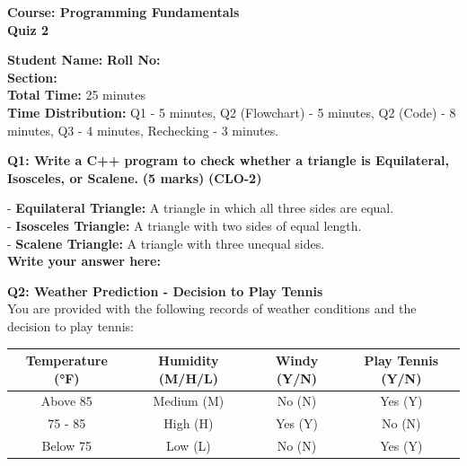 \documentclass[a4paper,12pt]{article}
\newcommand{\studentinfo}{
    \textbf{Student Name:} \underline{\hspace{4cm}} \hspace{0.5cm}
    \textbf{Roll No:} \underline{\hspace{3cm}} \hspace{0.5cm} \\
    \textbf{Section:} \underline{\hspace{2cm}} \\
}
\begin{document}
\begin{center}
    {\large \textbf{Course: Programming Fundamentals}} \\
    \vspace{0.2cm}
    {\Large \textbf{Quiz 2}} \\
\end{center}

\vspace{0.5cm}

\studentinfo

\vspace{0.5cm}
\textbf{Total Time:} 25 minutes \\
\textbf{Time Distribution:} Q1 - 5 minutes, Q2 (Flowchart) - 5 minutes, Q2 (Code) - 8 minutes, Q3 - 4 minutes, Rechecking - 3 minutes.
\vspace{0.5cm}

\textbf{Q1: Write a C++ program to check whether a triangle is Equilateral, Isosceles, or Scalene.} \hfill \textbf{(5 marks)}  \textbf{(CLO-2)}

 \vspace{0.5cm}
- \textbf{Equilateral Triangle:} A triangle in which all three sides are equal. \\
- \textbf{Isosceles Triangle:} A triangle with two sides of equal length. \\
- \textbf{Scalene Triangle:} A triangle with three unequal sides. \\


\textbf{Write your answer here:}
\begin{tcolorbox}[colframe=black, colback=white, width=\textwidth, height=12cm, valign=center]
\end{tcolorbox}

\vspace{0.5cm}

\textbf{Q2: Weather Prediction - Decision to Play Tennis}  \\
You are provided with the following records of weather conditions and the decision to play tennis:

\begin{center}
\begin{tabular}{|c|c|c|c|}
\hline
\textbf{Temperature (°F)} & \textbf{Humidity (M/H/L)} & \textbf{Windy (Y/N)} & \textbf{Play Tennis (Y/N)} \\
\hline
Above 85 & Medium (M) & No (N) & Yes (Y) \\
75 - 85 & High (H) & Yes (Y) & No (N) \\
Below 75 & Low (L) & No (N) & Yes (Y) \\
\hline
\end{tabular}
\end{center}
\end{document}
